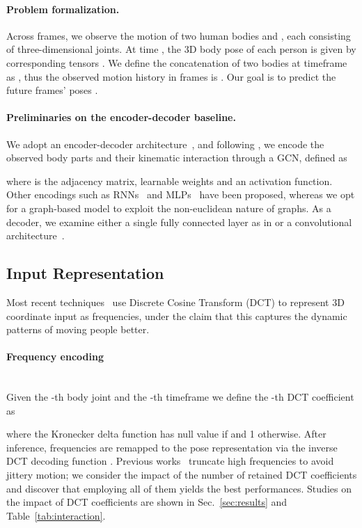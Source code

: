 \documentclass[10pt,twocolumn,letterpaper]{article}
\begin{document}
\paragraph{Problem formalization.} \label{par:prob}
Across  frames, we observe the motion of two human bodies  and , each consisting of  three-dimensional joints.
At time , the 3D body pose of each person is given by corresponding tensors . 
We define the concatenation of two bodies at timeframe  as , thus the observed motion history in  frames is . 
Our goal is to predict the future  frames' poses .

\paragraph{Preliminaries on the encoder-decoder baseline.} 
We adopt an encoder-decoder architecture~\cite{sofianos21, sampieri22}, and following \cite{yan18, zhang17}, we encode the observed body parts and their kinematic interaction through a GCN, defined as 

where  is the adjacency matrix,  learnable weights and  an activation function.
Other encodings such as RNNs~\cite{yong15, chiu19} and MLPs~\cite{guo2022back} have been proposed, whereas we opt for a graph-based model to exploit the non-euclidean nature of graphs.
As a decoder, we examine either a single fully connected layer as in \cite{guo2022back} or a convolutional architecture~\cite{sofianos21, Ma22}.

\subsection{Input Representation}\label{ssec:inp_rep}

Most recent techniques~\cite{guo2022back, mao19ltd, mao20his, Akhter08} use Discrete Cosine Transform (DCT) to represent 3D coordinate input as frequencies, under the claim that this captures the dynamic patterns of moving people better.

\paragraph{Frequency encoding} \label{para:dct} \greencheck \\
Given the -th body joint and the -th timeframe we define the -th DCT coefficient as 



where the Kronecker delta function   has null value if  and 1 otherwise.
After inference, frequencies are remapped to the pose representation via the inverse DCT decoding function .
Previous works~\cite{mao20his, mao21multi} truncate high frequencies to avoid jittery motion; we consider the impact of the number of retained DCT coefficients and discover that employing all of them yields the best performances.
Studies on the impact of DCT coefficients are shown in Sec.~\ref{sec:results} and Table~\ref{tab:interaction}.
\end{document}
